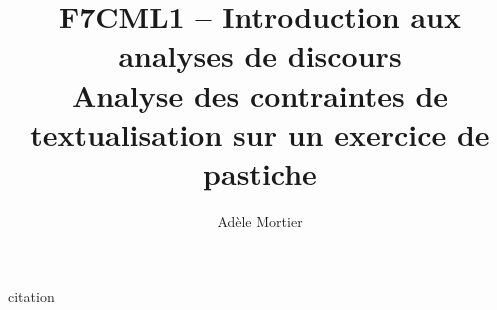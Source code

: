 \documentclass[a4paper,10pt]{article}
\title{F7CML1 -- Introduction aux analyses de discours\\
	 Analyse des contraintes de textualisation sur un exercice de pastiche}
\author{Adèle Mortier}
\begin{document}
\maketitle
\nocite{*}
\tableofcontents


\begin{center}
	\footnotesize
	\begin{minipage}{0.7\textwidth}
		citation
	\end{minipage}
\end{center}
\medskip



\end{document}
